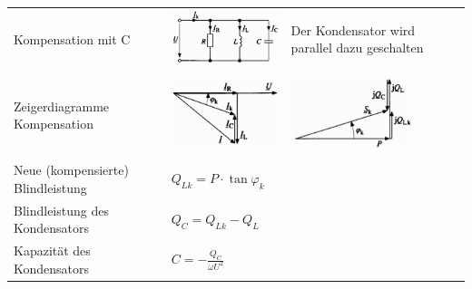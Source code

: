
\begin{tabular}{p{7cm}p{4.5cm}p{5cm}}
	Kompensation mit C &
    	\begin{minipage}{4cm}
        	\includegraphics[width=3.5cm]{bilder/Parallelkompensation.png}
        \end{minipage} & 
		Der Kondensator wird parallel dazu geschalten \\ \\
	Zeigerdiagramme Kompensation &
		\begin{minipage}{4.5cm}
        	\includegraphics[width=3.5cm]{bilder/Blindstromkompensation.png}
        \end{minipage} &
		\begin{minipage}{4.5cm}
        	\includegraphics[width=3.5cm]{bilder/Blindleistungskompensation.png}
        \end{minipage} \\ \\
	Neue (kompensierte) Blindleistung &
		$Q_{Lk} = P \cdot \tan{\varphi_k}$ \\
	Blindleistung des Kondensators &
		$Q_C = Q_{Lk} - Q_L$ \\
	Kapazit\"at des Kondensators &
		$C = -\frac{Q_C}{\omega U^2}$ \\	
	\end{tabular}